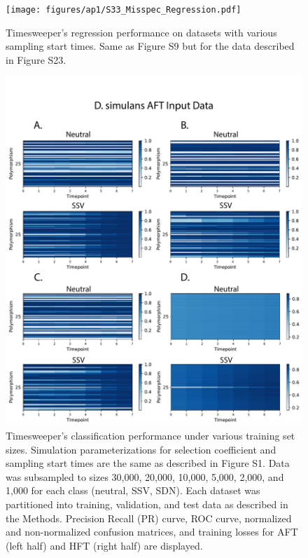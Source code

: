 \begin{figure}
    \centering
    \texttt{[image: figures/ap1/S33\_Misspec\_Regression.pdf]}
    \caption[Timesweeper’s regression performance on datasets with various sampling start times.]{Timesweeper’s regression performance on datasets with various sampling start times. Same as Figure S9 but for the data described in Figure S23.}
    \label{fig:S33_Misspec_Regression}
\end{figure}

\begin{figure}
    \centering
    \includegraphics[width=\textwidth]{figures/ap1/S34-D_sim_Inputs.pdf}
    \caption[Timesweeper’s classification performance under various training set sizes.]{Timesweeper’s classification performance under various training set sizes. Simulation parameterizations for selection coefficient and sampling start times are the same as described in Figure S1. Data was subsampled to sizes 30,000, 20,000, 10,000, 5,000, 2,000, and 1,000 for each class (neutral, SSV, SDN). Each dataset was partitioned into training, validation, and test data as described in the Methods. Precision Recall (PR) curve, ROC curve, normalized and non-normalized confusion matrices, and training losses for AFT (left half) and HFT (right half) are displayed.}
    \label{fig:S34-D_sim_Inputs}
\end{figure}

